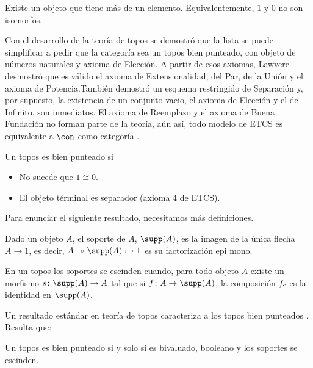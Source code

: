 \begin{axiom}
Existe un objeto que tiene más de un elemento. Equivalentemente,
$1$ y $0$ no son isomorfos.
\end{axiom}

Con el desarrollo de la teoría de topos se demostró que la lista se puede simplificar a pedir
que la categoría sea un topos bien punteado, con objeto de números naturales y axioma de Elección.
A partir de esos axiomas, Lawvere desmostró que es válido el axioma de Extensionalidad, del Par, de la Unión
y el axioma de Potencia.También demostró un esquema restringido de Separación y, por supuesto, la existencia
de un conjunto vacio, el axioma de Elección y el de Infinito, son inmediatos. El axioma de Reemplazo y el
axioma de Buena Fundación no forman parte de la teoría, aún así, todo modelo de ETCS es
equivalente a $\con$ como categoría \cite{lawvere1964elementary}.

\begin{definition}
    Un topos es bien punteado si
    \begin{itemize}
        \item No sucede que $1\cong 0$.
        \item El objeto términal es separador (axioma 4 de ETCS).
    \end{itemize}
\end{definition}

Para enunciar el siguiente resultado, necesitamos más definiciones.

\begin{definition}
    Dado un objeto $A$, el soporte de $A$, $\supp(A)$, es la imagen de la única flecha $A\to 1$, es decir,
    $A\twoheadrightarrow \supp(A)\rightarrowtail 1$ es su factorización epi mono.
\end{definition}

\begin{definition}
    En un topos los soportes se escinden cuando, para todo objeto $A$ existe un morfismo $s\colon\supp(A)\to A$
    tal que si $f\colon A\to\supp(A)$, la composición $fs$ es la identidad en $\supp(A)$.
\end{definition}

Un resultado estándar en teoría de topos caracteriza a los topos bien punteados \cite{maclane2012sheaves}. Resulta que:

\begin{theorem}
    Un topos es bien punteado si y solo si es bivaluado, booleano y los soportes se escinden.
\end{theorem}

